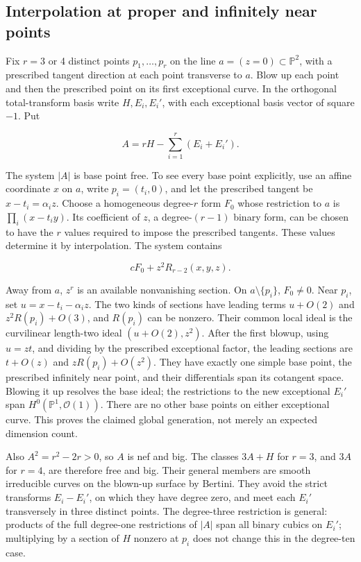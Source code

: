 \subsection{Interpolation at proper and infinitely near points}

Fix \(r=3\) or 4 distinct points \(p_1,\ldots,p_r\) on the line \(a=(z=0)\subset\mathbb P^2\), with a prescribed tangent direction at each point transverse to \(a\). Blow up each point and then the prescribed point on its first exceptional curve. In the orthogonal total-transform basis write \(H,E_i,E_i'\), with each exceptional basis vector of square \(-1\). Put

\[
A=rH-\sum_{i=1}^r(E_i+E_i').
\tag{IV.18.1}
\]

The system \(|A|\) is base point free. To see every base point explicitly, use an affine coordinate \(x\) on \(a\), write \(p_i=(t_i,0)\), and let the prescribed tangent be \(x-t_i=\alpha_i z\). Choose a homogeneous degree-\(r\) form \(F_0\) whose restriction to \(a\) is \(\prod_i(x-t_i y)\). Its coefficient of \(z\), a degree-\((r-1)\) binary form, can be chosen to have the \(r\) values required to impose the prescribed tangents. These values determine it by interpolation. The system contains

\[
cF_0+z^2R_{r-2}(x,y,z).
\tag{IV.18.2}
\]

Away from \(a\), \(z^r\) is an available nonvanishing section. On \(a\setminus\{p_i\}\), \(F_0\ne 0\). Near \(p_i\), set \(u=x-t_i-\alpha_i z\). The two kinds of sections have leading terms \(u+O(2)\) and \(z^2 R(p_i)+O(3)\), and \(R(p_i)\) can be nonzero. Their common local ideal is the curvilinear length-two ideal \((u+O(2),z^2)\). After the first blowup, using \(u=zt\), and dividing by the prescribed exceptional factor, the leading sections are \(t+O(z)\) and \(z R(p_i)+O(z^2)\). They have exactly one simple base point, the prescribed infinitely near point, and their differentials span its cotangent space. Blowing it up resolves the base ideal; the restrictions to the new exceptional \(E_i'\) span \(H^0(\mathbb P^1,\mathcal O(1))\). There are no other base points on either exceptional curve. This proves the claimed global generation, not merely an expected dimension count.

Also \(A^2=r^2-2 r>0\), so \(A\) is nef and big. The classes \(3 A+H\) for \(r=3\), and \(3A\) for \(r=4\), are therefore free and big. Their general members are smooth irreducible curves on the blown-up surface by Bertini. They avoid the strict transforms \(E_i-E_i'\), on which they have degree zero, and meet each \(E_i'\) transversely in three distinct points. The degree-three restriction is general: products of the full degree-one restrictions of \(|A|\) span all binary cubics on \(E_i'\); multiplying by a section of \(H\) nonzero at \(p_i\) does not change this in the degree-ten case.

